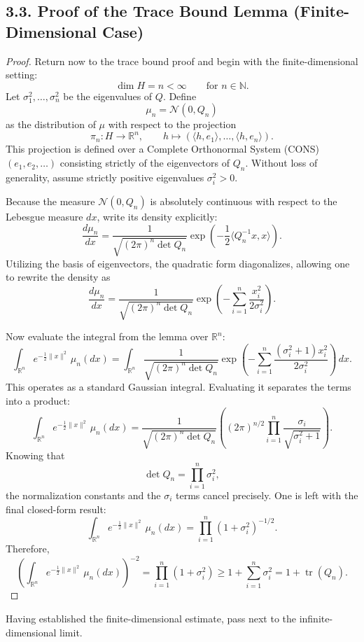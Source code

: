 \documentclass[11pt]{article}
\theoremstyle{definition}
\theoremstyle{remark}
\DeclareMathOperator{\tr}{tr}
\begin{document}
\subsection*{3.3. Proof of the Trace Bound Lemma (Finite-Dimensional Case)}
\begin{proof}
Return now to the trace bound proof and begin with the finite-dimensional setting:
\[
\dim H=n<\infty
\qquad \text{for } n\in\mathbb N.
\]
Let \(\sigma_1^2,\ldots,\sigma_n^2\) be the eigenvalues of $Q$. Define
\[
\mu_n=\mathcal N(0,Q_n)
\]
as the distribution of \(\mu\) with respect to the projection
\[
\pi_n:H\to\mathbb R^n,
\qquad
h\mapsto (\langle h,e_1\rangle,\ldots,\langle h,e_n\rangle).
\]
This projection is defined over a Complete Orthonormal System (CONS) \((e_1,e_2,\ldots)\) consisting strictly of the eigenvectors of $Q_n$. Without loss of generality, assume strictly positive eigenvalues \(\sigma_i^2>0\).

Because the measure \(\mathcal N(0,Q_n)\) is absolutely continuous with respect to the Lebesgue measure \(dx\), write its density explicitly:
\[
\frac{d\mu_n}{dx}
=
\frac{1}{\sqrt{(2\pi)^n\det Q_n}}
\exp\left(-\frac{1}{2}\langle Q_n^{-1}x,x\rangle\right).
\]
Utilizing the basis of eigenvectors, the quadratic form diagonalizes, allowing one to rewrite the density as
\[
\frac{d\mu_n}{dx}
=
\frac{1}{\sqrt{(2\pi)^n\det Q_n}}
\exp\left(-\sum_{i=1}^n \frac{x_i^2}{2\sigma_i^2}\right).
\]

Now evaluate the integral from the lemma over \(\mathbb R^n\):
\[
\int_{\mathbb R^n} e^{-\frac{1}{2}\|x\|^2}\,\mu_n(dx)
=
\int_{\mathbb R^n}
\frac{1}{\sqrt{(2\pi)^n\det Q_n}}
\exp\left(-\sum_{i=1}^n \frac{(\sigma_i^2+1)x_i^2}{2\sigma_i^2}\right)\,dx.
\]
This operates as a standard Gaussian integral. Evaluating it separates the terms into a product:
\[
\int_{\mathbb R^n} e^{-\frac{1}{2}\|x\|^2}\,\mu_n(dx)
=
\frac{1}{\sqrt{(2\pi)^n\det Q_n}}
\left(
(2\pi)^{n/2}
\prod_{i=1}^n \frac{\sigma_i}{\sqrt{\sigma_i^2+1}}
\right).
\]
Knowing that
\[
\det Q_n=\prod_{i=1}^n \sigma_i^2,
\]
the normalization constants and the \(\sigma_i\) terms cancel precisely. One is left with the final closed-form result:
\[
\int_{\mathbb R^n} e^{-\frac{1}{2}\|x\|^2}\,\mu_n(dx)
=
\prod_{i=1}^n (1+\sigma_i^2)^{-1/2}.
\]
Therefore,
\[
\left(\int_{\mathbb R^n} e^{-\frac{1}{2}\|x\|^2}\,\mu_n(dx)\right)^{-2}
=
\prod_{i=1}^n (1+\sigma_i^2)
\ge
1+\sum_{i=1}^n \sigma_i^2
=
1+\tr(Q_n).
\]
\end{proof}

Having established the finite-dimensional estimate, pass next to the infinite-dimensional limit.
\end{document}
